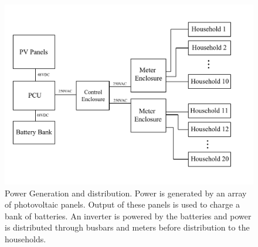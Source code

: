 \documentclass{sig-alternate}
\begin{document}
\begin{figure}[]
\begin{center}
\includegraphics[width=\columnwidth]{figures/ShedWiringDiagram.pdf}
\end{center}
\caption{Power Generation and distribution.
Power is generated by an array of photovoltaic panels.
Output of these panels is used to charge a bank of batteries.
An inverter is powered by the batteries and power is distributed
through busbars and meters before distribution to the households.}
\label{ShedWiringDiagram}
\end{figure}
\end{document}
